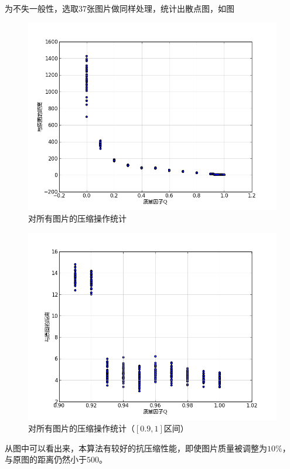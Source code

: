 为不失一般性，选取37张图片做同样处理，统计出散点图，如图
\begin{figure}[H]
  \centering
  \includegraphics[keepaspectratio=true,
  scale=0.6]{images/quality_all.png}
  \caption{对所有图片的压缩操作统计}
  \label{fig:quality-all-scatter-plot}
\end{figure}

\begin{figure}[H]
  \centering
  \includegraphics[keepaspectratio=true,
  scale=0.6]{images/quality_all_0.9_1.png}
  \caption{对所有图片的压缩操作统计（$[0.9, 1]$区间）}
  \label{fig:quality-gs0-sub-scatter-plot}
\end{figure}

从图中可以看出来，本算法有较好的抗压缩性能，即使图片质量被调整为$10\%$，
与原图的距离仍然小于$500$。

